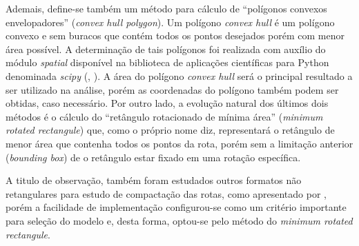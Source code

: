 Ademais, define-se também um método para cálculo de ``polígonos convexos envelopadores'' (\textit{convex hull polygon}).
Um polígono \textit{convex hull} é um polígono convexo e sem buracos que contém todos os pontos desejados porém com menor área possível.
A determinação de tais polígonos foi realizada com auxílio do módulo \textit{spatial} disponível na biblioteca de aplicações científicas para Python denominada \textit{scipy} (, \citeyear{2020SciPy-NMeth}).
A área do polígono \textit{convex hull} será o principal resultado a ser utilizado na análise, porém as coordenadas do polígono também podem ser obtidas, caso necessário.
%
Por outro lado, a evolução natural dos últimos dois métodos é o cálculo do ``retângulo rotacionado de mínima área'' (\textit{minimum rotated rectangule}) que, como o próprio nome diz, representará o retângulo de menor área que contenha todos os pontos da rota, porém sem a limitação anterior (\textit{bounding box}) de o retângulo estar fixado em uma rotação específica.

A titulo de observação, também foram estudados outros formatos não retangulares para estudo de compactação das rotas, como apresentado por , porém a facilidade de implementação configurou-se como um critério importante para seleção do modelo e, desta forma, optou-se pelo método do \textit{minimum rotated rectangule}.

